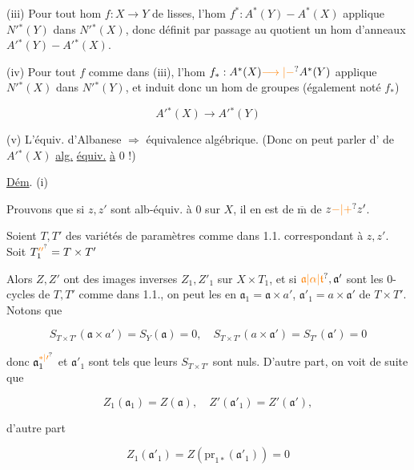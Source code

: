 (iii) Pour tout hom $f:X\longrightarrow Y$ de  lisses, l'hom $f^*:A^*(Y)-A^*(X)$ applique $N'{}^*(Y)$ dans $N'{}^*(X)$, donc définit par passage au quotient un hom d'anneaux $A'{}^*(Y)-A'{}^*(X)$.

(iv) Pour tout $f$ comme dans (iii),  l'hom  $f_*:A^*(X)\unsure{\longrightarrow|-}A^*(Y)$  applique $N'{}^*(X)$ dans $N'{}^*(Y)$, et induit donc un hom de groupes (également noté $f_*$)

\[
A'{}^*(X)\longrightarrow A'{}^*(Y)
\]

(v) L'équiv. d'Albanese $\Longrightarrow$ équivalence algébrique. (Donc on peut parler d' de $A'{}^*(X)$ \uline{alg.} \uline{équiv.} \uline{à} $0$ !)

\uline{Dém}. (i)  

Prouvons que si $z,z'$ sont alb-équiv. à $0$ sur $X$, il en est de $\overline{\mathrm m}$ de $z\unsure{-|+}z'$.

Soient $T,T'$ des variétés de paramètres comme dans 1.1. correspondant à $z,z'$. Soit $T_{1}^{\unsure{\prime\prime}}=T\times T'$

Alors $Z,Z'$ ont des images inverses $Z_1,Z'_1$ sur $X\times T_1$, et si $\unsure{\mathfrak a|\alpha|\mathfrak{t}},\mathfrak a'$ sont les $0$-cycles de $T,T'$ comme dans 1.1., on peut les  en $\mathfrak a_1=\mathfrak a\times a'$, $\mathfrak a'_1=a\times\mathfrak a'$ de $T\times T'$. Notons que


\[
S_{T\times T'}(\mathfrak a\times a')=S_Y(\mathfrak a)=0,\quad S_{T\times T'}(a\times\mathfrak a')=S_{T'}(\mathfrak a')=0
\]

donc $\mathfrak a_1^{\unsure{*|\prime}}$ et $\mathfrak a'_1$ sont  tels que leurs $S_{T\times T'}$ sont nuls. D'autre part, on voit de suite que

\[
Z_1(\mathfrak a_1)=Z(\mathfrak a),\quad Z'(\mathfrak a'_1)=Z'(\mathfrak a'),
\]

 d'autre part

\[
Z_1(\mathfrak a'_1)=Z(\mathrm{pr}_{1*}(\mathfrak a'_1))=0
\]

